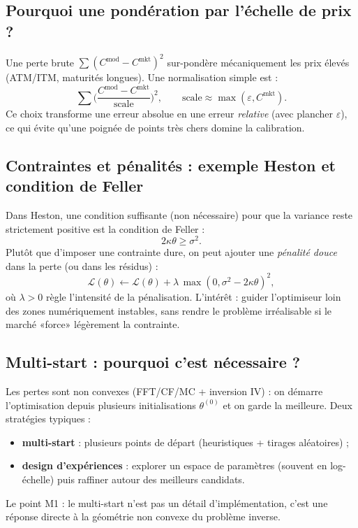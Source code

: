 \documentclass[11pt,a4paper]{report}
\theoremstyle{definition}
\theoremstyle{plain}
\theoremstyle{remark}
\newcommand{\1}{\mathbf{1}}
\begin{document}
\subsection*{Pourquoi une pondération par l'échelle de prix ?}
Une perte brute $\sum (C^{\text{mod}}-C^{\text{mkt}})^2$ sur-pondère mécaniquement les prix élevés (ATM/ITM, maturités longues). Une normalisation simple est :
\[
\sum \Big(\frac{C^{\text{mod}}-C^{\text{mkt}}}{\text{scale}}\Big)^2,\qquad \text{scale}\approx \max(\varepsilon, C^{\text{mkt}}).
\]
Ce choix transforme une erreur absolue en une erreur \emph{relative} (avec plancher $\varepsilon$), ce qui évite qu'une poignée de points très chers domine la calibration.

\subsection*{Contraintes et pénalités : exemple Heston et condition de Feller}
Dans Heston, une condition suffisante (non nécessaire) pour que la variance reste strictement positive est la condition de Feller :
\[
2\kappa\theta \ge \sigma^2.
\]
Plutôt que d'imposer une contrainte dure, on peut ajouter une \emph{pénalité douce} dans la perte (ou dans les résidus) :
\[
\mathcal{L}(\theta)\gets \mathcal{L}(\theta) + \lambda\,\max(0,\sigma^2-2\kappa\theta)^2,
\]
où $\lambda>0$ règle l'intensité de la pénalisation. L'intérêt : guider l'optimiseur loin des zones numériquement instables, sans rendre le problème irréalisable si le marché «force» légèrement la contrainte.

\subsection*{Multi-start : pourquoi c'est nécessaire ?}
Les pertes sont non convexes (FFT/CF/MC + inversion IV) : on démarre l'optimisation depuis plusieurs initialisations $\theta^{(0)}$ et on garde la meilleure. Deux stratégies typiques :
\begin{itemize}[leftmargin=*]
\item \textbf{multi-start} : plusieurs points de départ (heuristiques + tirages aléatoires) ;
\item \textbf{design d'expériences} : explorer un espace de paramètres (souvent en log-échelle) puis raffiner autour des meilleurs candidats.
\end{itemize}
Le point M1 : le multi-start n'est pas un détail d'implémentation, c'est une réponse directe à la géométrie non convexe du problème inverse.
\end{document}
